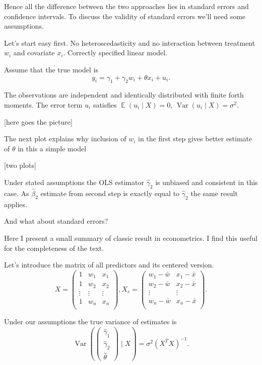 \documentclass[10pt, a4paper]{article}
\DeclareMathOperator{\Var}{Var}
\DeclareMathOperator{\E}{\mathbb{E}}
\begin{document}
Hence all the difference between the two approaches lies in standard errors and confidence intervals.
To discuss the validity of standard errors we'll need some assumptions.


Let's start easy first. No heteroscedasticity and no interaction between treatment $w_i$ and covariate $x_i$.
Correctly specified linear model. 

Assume that the true model is 
\[
y_i = \gamma_1 + \gamma_2 w_i + \theta x_i + u_i.
\]

The observations are independent and identically distributed with finite forth moments. 
The error term $u_i$ satisfies $\E(u_i \mid X) = 0$, $\Var(u_i \mid X) = \sigma^2$.

[here goes the picture]


The next plot explains why inclusion of $w_i$ in the first step 
gives better estimate of $\theta$ in this a simple model 

[two plots]


Under stated assumptions the OLS estimator $\hat\gamma_2$ is unbiased and consistent in this case.
As $\hat\beta_2$ estimate from second step is exactly equal to $\hat\gamma_2$ the same result applies.

And what about standard errors?

Here I present a small summary of classic result in econometrics. 
I find this useful for the completeness of the text. 

Let's introduce the matrix of all predictors and its centered version.
\[
X = \begin{pmatrix}
    1 & w_1 & x_1 \\
    1 & w_2 & x_2 \\
    \vdots & \vdots & \vdots \\
    1 & w_n & x_n \\
\end{pmatrix},
X_c = \begin{pmatrix}
    w_1 - \bar w & x_1 - \bar x \\
    w_2 - \bar w & x_2 - \bar x\\
    \vdots & \vdots \\
    w_n - \bar w& x_n  - \bar x \\
\end{pmatrix}.    
\]


Under our assumptions the true variance of estimates is
\[
\Var\left( 
\begin{pmatrix}    
    \hat \gamma_1 \\
    \hat \gamma_2 \\
    \hat \theta
\end{pmatrix}
\mid X \right) = \sigma^2 (X^TX)^{-1}.
\]
\end{document}
